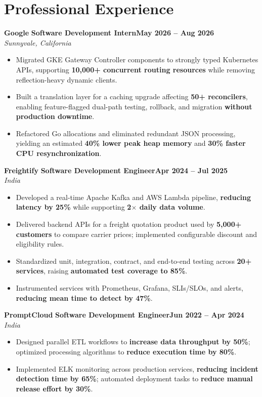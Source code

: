 \documentclass[10pt,letterpaper]{article}
\newcommand{\workEntry}[4]{%
  \textbf{#1} \textbar{} \textbf{#2}\hfill\textbf{#4}\\[-1.0pt]
  \textit{#3}\par\vspace{-1.3pt}
}
\begin{document}
\section{Professional Experience}
\workEntry{Google}{Software Development Intern}{Sunnyvale, California}{May 2026 -- Aug 2026}
\begin{itemize}
  \item Migrated GKE Gateway Controller components to strongly typed Kubernetes APIs, supporting \textbf{10,000+ concurrent routing resources} while removing reflection-heavy dynamic clients.
  \item Built a translation layer for a caching upgrade affecting \textbf{50+ reconcilers}, enabling feature-flagged dual-path testing, rollback, and migration \textbf{without production downtime}.
  \item Refactored Go allocations and eliminated redundant JSON processing, yielding an estimated \textbf{40\% lower peak heap memory} and \textbf{30\% faster CPU resynchronization}.
\end{itemize}
\vspace{0pt}
\workEntry{Freightify}{Software Development Engineer}{India}{Apr 2024 -- Jul 2025}
\begin{itemize}
  \item Developed a real-time Apache Kafka and AWS Lambda pipeline, \textbf{reducing latency by 25\%} while supporting \textbf{2$\times$ daily data volume}.
  \item Delivered backend APIs for a freight quotation product used by \textbf{5,000+ customers} to compare carrier prices; implemented configurable discount and eligibility rules.
  \item Standardized unit, integration, contract, and end-to-end testing across \textbf{20+ services}, raising \textbf{automated test coverage to 85\%}.
  \item Instrumented services with Prometheus, Grafana, SLIs/SLOs, and alerts, \textbf{reducing mean time to detect by 47\%}.
\end{itemize}
\vspace{0pt}
\workEntry{PromptCloud}{Software Development Engineer}{India}{Jun 2022 -- Apr 2024}
\begin{itemize}
  \item Designed parallel ETL workflows to \textbf{increase data throughput by 50\%}; optimized processing algorithms to \textbf{reduce execution time by 80\%}.
  \item Implemented ELK monitoring across production services, \textbf{reducing incident detection time by 65\%}; automated deployment tasks to \textbf{reduce manual release effort by 30\%}.
\end{itemize}
\end{document}
